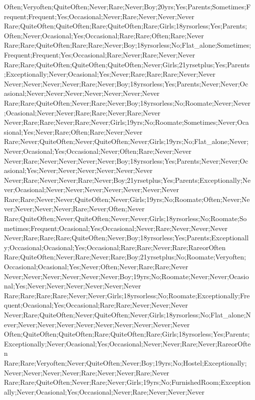 Often;Veryoften;QuiteOften;Never;Rare;Never;Boy;20yrs;Yes;Parents;Sometimes;Frequent;Frequent;Yes;Occasional;Never;Rare;Never;Never;Never
Rare;QuiteOften;QuiteOften;Rare;QuiteOften;Rare;Girls;18yrsorless;Yes;Parents;Often;Never;Ocasional;Yes;Occasional;Rare;Rare;Often;Rare;Never
Rare;Rare;QuiteOften;Rare;Rare;Never;Boy;18yrsorless;No;Flat_alone;Sometimes;Frequent;Frequent;Yes;Occasional;Rare;Never;Rare;Never;Never
Rare;Rare;QuiteOften;QuiteOften;QuiteOften;Never;Girls;21yrsetplus;Yes;Parents;Exceptionally;Never;Ocasional;Yes;Never;Rare;Rare;Rare;Never;Never
Never;Never;Never;Never;Rare;Never;Boy;18yrsorless;Yes;Parents;Never;Never;Ocasional;Never;Never;Never;Never;Never;Never;Never
Rare;Rare;QuiteOften;Never;Rare;Never;Boy;18yrsorless;No;Roomate;Never;Never;Ocasional;Never;Never;Rare;Rare;Never;Rare;Never
Never;Rare;Rare;Never;Rare;Never;Girls;19yrs;No;Roomate;Sometimes;Never;Ocasional;Yes;Never;Rare;Often;Rare;Never;Never
Rare;Never;QuiteOften;Never;QuiteOften;Never;Girls;19yrs;No;Flat_alone;Never;Never;Ocasional;Yes;Occasional;Never;Often;Rare;Never;Never
Never;Rare;Never;Never;Never;Never;Boy;18yrsorless;Yes;Parents;Never;Never;Ocasional;Yes;Never;Never;Never;Never;Never;Never
Never;Rare;Never;Never;Rare;Never;Boy;21yrsetplus;Yes;Parents;Exceptionally;Never;Ocasional;Never;Never;Never;Never;Never;Never;Never
Rare;Rare;Never;Never;QuiteOften;Never;Girls;19yrs;No;Roomate;Often;Never;Never;Never;Never;Never;Rare;Never;Often;Never
Rare;QuiteOften;Never;QuiteOften;Never;Never;Girls;18yrsorless;No;Roomate;Sometimes;Frequent;Ocasional;Yes;Occasional;Never;Rare;Never;Never;Never
Never;Rare;Rare;Rare;QuiteOften;Never;Boy;18yrsorless;Yes;Parents;Exceptionally;Occasional;Ocasional;Yes;Occasional;Rare;Rare;Never;Rare;RareorOften
Rare;QuiteOften;Never;Rare;Never;Rare;Boy;21yrsetplus;No;Roomate;Veryoften;Occasional;Ocasional;Yes;Never;Often;Never;Rare;Rare;Never
Never;Never;Never;Never;Never;Never;Boy;19yrs;No;Roomate;Never;Never;Ocasional;Yes;Never;Never;Never;Never;Never;Never
Rare;Rare;Rare;Rare;Never;Never;Girls;18yrsorless;No;Roomate;Exceptionally;Frequent;Ocasional;Yes;Occasional;Rare;Rare;Never;Never;Never
Never;Rare;QuiteOften;Never;QuiteOften;Never;Girls;18yrsorless;No;Flat_alone;Never;Never;Never;Never;Never;Never;Never;Never;Never;Never
Often;QuiteOften;QuiteOften;Rare;QuiteOften;Rare;Girls;18yrsorless;Yes;Parents;Exceptionally;Never;Ocasional;Yes;Occasional;Never;Never;Rare;Never;RareorOften
Rare;Rare;Veryoften;Never;QuiteOften;Never;Boy;19yrs;No;Hostel;Exceptionally;Never;Never;Never;Never;Rare;Never;Never;Rare;Never
Rare;Rare;QuiteOften;Never;Rare;Never;Girls;19yrs;No;FurnishedRoom;Exceptionally;Never;Ocasional;Yes;Occasional;Never;Rare;Never;Never;Never
